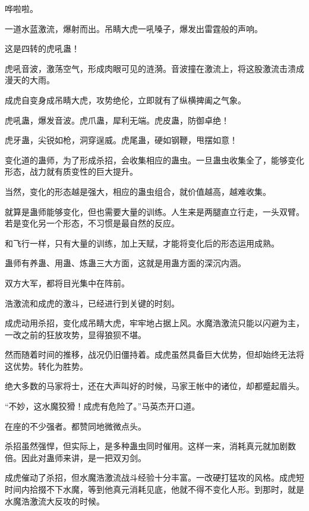 
\begin{this_body}



哗啦啦。

一道水蓝激流，爆射而出。吊睛大虎一吼嗓子，爆发出雷霆般的声响。

这是四转的虎吼蛊！

虎吼音波，激荡空气，形成肉眼可见的涟漪。音波撞在激流上，将这股激流击溃成漫天的大雨。

成虎自变身成吊睛大虎，攻势绝伦，立即就有了纵横捭阖之气象。

虎吼蛊，爆发音波。虎爪蛊，犀利无端。虎皮蛊，防御卓绝！

虎牙蛊，尖锐如枪，洞穿逞威。虎尾蛊，硬如钢鞭，甩摆如意！

变化道的蛊师，为了形成杀招，会收集相应的蛊虫。一旦蛊虫收集全了，能够变化形态，战力就有质变性的巨大提升。

当然，变化的形态越是强大，相应的蛊虫组合，就价值越高，越难收集。

就算是蛊师能够变化，但也需要大量的训练。人生来是两腿直立行走，一头双臂。若是变化另一个形态，不习惯是最自然的反应。

和飞行一样，只有大量的训练，加上天赋，才能将变化后的形态运用成熟。

蛊师有养蛊、用蛊、炼蛊三大方面，这就是用蛊方面的深沉内涵。

双方大军，都将目光集中在阵前。

浩激流和成虎的激斗，已经进行到关键的时刻。

成虎动用杀招，变化成吊睛大虎，牢牢地占据上风。水魔浩激流只能以闪避为主，一改之前的狂放攻势，显得狼狈不堪。

然而随着时间的推移，战况仍旧僵持着。成虎虽然具备巨大优势，但却始终无法将这优势。转化为胜势。

绝大多数的马家将士，还在大声叫好的时候，马家王帐中的诸位，却都蹙起眉头。

“不妙，这水魔狡猾！成虎有危险了。”马英杰开口道。

在座的不少强者。都赞同地微微点头。

杀招虽然强悍，但实际上，是多种蛊虫同时催用。这样一来，消耗真元就加剧数倍。因此对蛊师来讲，是一把双刃剑。

成虎催动了杀招，但水魔浩激流战斗经验十分丰富。一改硬打猛攻的风格。成虎短时间内拾掇不下水魔，等到他真元消耗见底，他就不得不变化人形。到那时，就是水魔浩激流大反攻的时候。


\end{this_body}
